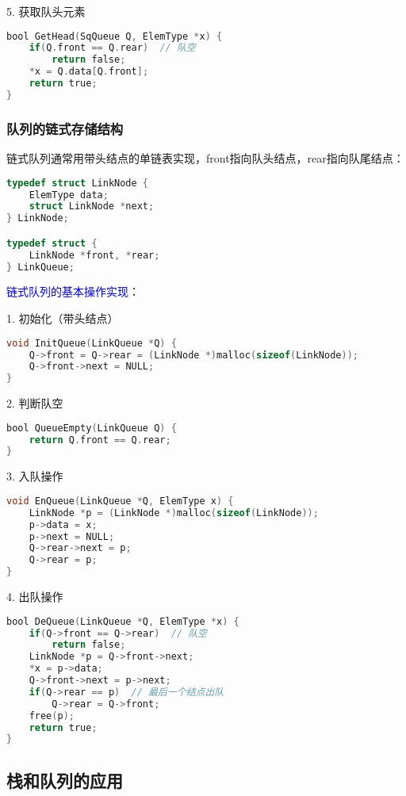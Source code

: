 \documentclass{../../note}
\begin{document}
5. 获取队头元素
\begin{lstlisting}[language=C]
bool GetHead(SqQueue Q, ElemType *x) {
    if(Q.front == Q.rear)  // 队空
        return false;
    *x = Q.data[Q.front];
    return true;
}
\end{lstlisting}

\subsubsection{队列的链式存储结构}

链式队列通常用带头结点的单链表实现，front指向队头结点，rear指向队尾结点：

\begin{lstlisting}[language=C]
typedef struct LinkNode {
    ElemType data;
    struct LinkNode *next;
} LinkNode;

typedef struct {
    LinkNode *front, *rear;
} LinkQueue;
\end{lstlisting}

\textcolor{blue}{链式队列的基本操作实现}：

1. 初始化（带头结点）
\begin{lstlisting}[language=C]
void InitQueue(LinkQueue *Q) {
    Q->front = Q->rear = (LinkNode *)malloc(sizeof(LinkNode));
    Q->front->next = NULL;
}
\end{lstlisting}

2. 判断队空
\begin{lstlisting}[language=C]
bool QueueEmpty(LinkQueue Q) {
    return Q.front == Q.rear;
}
\end{lstlisting}

3. 入队操作
\begin{lstlisting}[language=C]
void EnQueue(LinkQueue *Q, ElemType x) {
    LinkNode *p = (LinkNode *)malloc(sizeof(LinkNode));
    p->data = x;
    p->next = NULL;
    Q->rear->next = p;
    Q->rear = p;
}
\end{lstlisting}

4. 出队操作
\begin{lstlisting}[language=C]
bool DeQueue(LinkQueue *Q, ElemType *x) {
    if(Q->front == Q->rear)  // 队空
        return false;
    LinkNode *p = Q->front->next;
    *x = p->data;
    Q->front->next = p->next;
    if(Q->rear == p)  // 最后一个结点出队
        Q->rear = Q->front;
    free(p);
    return true;
}
\end{lstlisting}

\subsection{栈和队列的应用}
\end{document}
